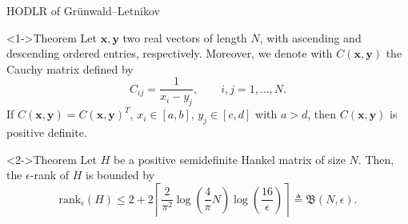\documentclass[aspectratio=169,xcolor=dvipsnames]{beamer}
\begin{document}
	\begin{frame}{HODLR of Gr\"unwald--Letnikov}
		
	\begin{alertblock}<1->{Theorem \parencite[Theorem A]{MR2566483}}
	Let $\mathbf x, \mathbf y$ two real vectors of length $N$,
	with ascending and descending ordered entries, respectively.
	Moreover, we denote with  $C(\mathbf x, \mathbf y)$ the Cauchy matrix defined by\vspace{-0.5em}
	\[
	C_{ij} = \frac{1}{x_i - y_j}, \qquad
	i,j = 1, \ldots, N.
	\]
	If $C(\mathbf x, \mathbf y) = C(\mathbf x, \mathbf y)^T$, 
	$x_i \in [a, b]$, $y_j \in [c, d]$ with $a > d$,
	then $C(\mathbf x, \mathbf y)$ is positive definite.
	\end{alertblock}
		
	\begin{alertblock}<2->{Theorem \parencite[Theorem 5.5]{MR3947283}}
		Let $H$ be a positive semidefinite Hankel matrix of size $N$. Then,
	the $\epsilon$-rank of $H$ is bounded by\vspace{-0.5em}
	\[
	\mathrm{rank}_{\epsilon}(H) \leq 2 + 2\left\lceil
	\frac{2}{\pi^2} \log \left( \frac {4}{\pi}N \right)
	\log\left(\frac{16}{\epsilon}\right)
	\right\rceil \triangleq \mathfrak B(N, \epsilon).
	\]
	\end{alertblock}
	
	\end{frame}
\end{document}
